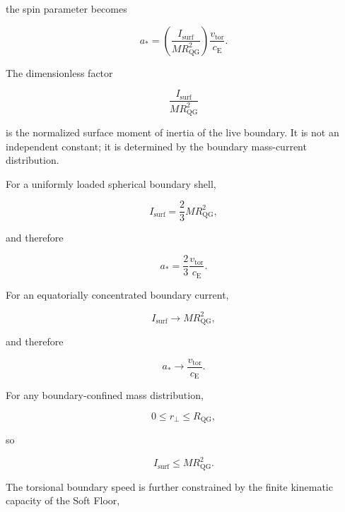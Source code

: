 the spin parameter becomes

\begin{equation}
    a_\ast
    =
    \left(
    \frac{I_{\mathrm{surf}}}{M R_{\mathrm{QG}}^2}
    \right)
    \frac{v_{\mathrm{tor}}}{c_{\mathrm{E}}}.
\end{equation}

The dimensionless factor

\begin{equation}
    \frac{I_{\mathrm{surf}}}{M R_{\mathrm{QG}}^2}
\end{equation}

is the normalized surface moment of inertia of the live boundary. It is not an independent constant; it is determined by the boundary mass-current distribution.

For a uniformly loaded spherical boundary shell,

\begin{equation}
    I_{\mathrm{surf}}
    =
    \frac{2}{3}
    M R_{\mathrm{QG}}^2,
\end{equation}

and therefore

\begin{equation}
    a_\ast
    =
    \frac{2}{3}
    \frac{v_{\mathrm{tor}}}{c_{\mathrm{E}}}.
\end{equation}

For an equatorially concentrated boundary current,

\begin{equation}
    I_{\mathrm{surf}}
    \rightarrow
    M R_{\mathrm{QG}}^2,
\end{equation}

and therefore

\begin{equation}
    a_\ast
    \rightarrow
    \frac{v_{\mathrm{tor}}}{c_{\mathrm{E}}}.
\end{equation}

For any boundary-confined mass distribution,

\begin{equation}
    0
    \leq
    r_\perp
    \leq
    R_{\mathrm{QG}},
\end{equation}

so

\begin{equation}
    I_{\mathrm{surf}}
    \leq
    M R_{\mathrm{QG}}^2.
\end{equation}

The torsional boundary speed is further constrained by the finite kinematic capacity of the Soft Floor,


